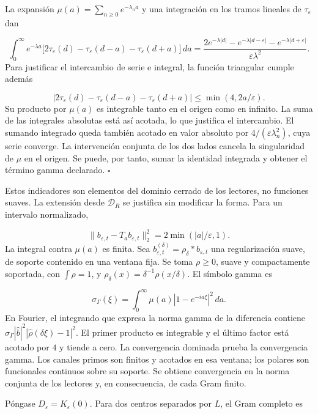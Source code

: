La expansión \(\mu(a)=\sum_{n\geq0}e^{-\lambda_na}\) y una integración en los tramos lineales de \(\tau_\varepsilon\) dan

\[
\int_0^\infty e^{-\lambda a}
\bigl[2\tau_\varepsilon(d)-\tau_\varepsilon(d-a)
-\tau_\varepsilon(d+a)\bigr]\,da
=\frac{2e^{-\lambda|d|}-e^{-\lambda|d-\varepsilon|}
-e^{-\lambda|d+\varepsilon|}}{\varepsilon\lambda^2}.
\]
Para justificar el intercambio de serie e integral, la función triangular cumple además

\[
|2\tau_\varepsilon(d)-\tau_\varepsilon(d-a)-\tau_\varepsilon(d+a)|
\leq\min(4,2a/\varepsilon).
\]
Su producto por \(\mu(a)\) es integrable tanto en el origen como en infinito. La suma de las integrales absolutas está así acotada, lo que justifica el intercambio. El sumando integrado queda también acotado en valor absoluto por \(4/(\varepsilon\lambda_n^2)\), cuya serie converge. La intervención conjunta de los dos lados cancela la singularidad de \(\mu\) en el origen. Se puede, por tanto, sumar la identidad integrada y obtener el término gamma declarado. \hfill\(\square\)

Estos indicadores son elementos del dominio cerrado de los lectores, no funciones suaves. La extensión desde \(\mathcal D_R\) se justifica sin modificar la forma. Para un intervalo normalizado,

\[
\|b_{\varepsilon,t}-T_ab_{\varepsilon,t}\|_2^2
=2\min(|a|/\varepsilon,1).
\]
La integral contra \(\mu(a)\) es finita. Sea \(b_{\varepsilon,t}^{(\delta)}=\rho_\delta*b_{\varepsilon,t}\) una regularización suave, de soporte contenido en una ventana fija. Se toma \(\rho\geq0\), suave y compactamente soportada, con \(\int\rho=1\), y \(\rho_\delta(x)=\delta^{-1}\rho(x/\delta)\). El símbolo gamma es

\[
\sigma_\Gamma(\xi)=\int_0^\infty
\mu(a)|1-e^{-ia\xi}|^2\,da.
\]
En Fourier, el integrando que expresa la norma gamma de la diferencia contiene \(\sigma_\Gamma|\widehat b|^2 |\widehat\rho(\delta\xi)-1|^2\). El primer producto es integrable y el último factor está acotado por \(4\) y tiende a cero. La convergencia dominada prueba la convergencia gamma. Los canales primos son finitos y acotados en esa ventana; los polares son funcionales continuos sobre su soporte. Se obtiene convergencia en la norma conjunta de los lectores y, en consecuencia, de cada Gram finito.

Póngase \(D_\varepsilon=K_\varepsilon(0)\). Para dos centros separados por \(L\), el Gram completo es

